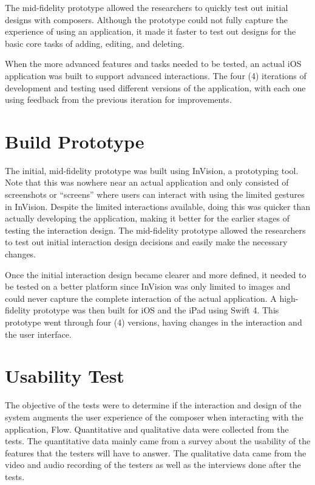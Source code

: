 		The mid-fidelity prototype allowed the researchers to quickly test out initial designs with composers. Although the prototype could not fully capture the experience of using an application, it made it faster to test out designs for the basic core tasks of adding, editing, and deleting. 

		When the more advanced features and tasks needed to be tested, an actual iOS application was built to support advanced interactions. The four (4) iterations of development and testing used different versions of the application, with each one using feedback from the previous iteration for improvements. 

	\section{Build Prototype}

		The initial, mid-fidelity prototype was built using InVision, a prototyping tool. Note that this was nowhere near an actual application and only consisted of screenshots or ``screens'' where users can interact with using the limited gestures in InVision. Despite the limited interactions available, doing this was quicker than actually developing the application, making it better for the earlier stages of testing the interaction design. The mid-fidelity prototype allowed the researchers to test out initial interaction design decisions and easily make the necessary changes. 

		Once the initial interaction design became clearer and more defined, it needed to be tested on a better platform since InVision was only limited to images and could never capture the complete interaction of the actual application. A high-fidelity prototype was then built for iOS and the iPad using Swift 4. This prototype went through four (4) versions, having changes in the interaction and the user interface. 

	\section{Usability Test}

		The objective of the tests were to determine if the interaction and design of the system augments the user experience of the composer when interacting with the application, Flow.  Quantitative and qualitative data were collected from the tests. The quantitative data mainly came from a survey about the usability of the features that the testers will have to answer. The qualitative data came from the video and audio recording of the testers as well as the interviews done after the tests. %

